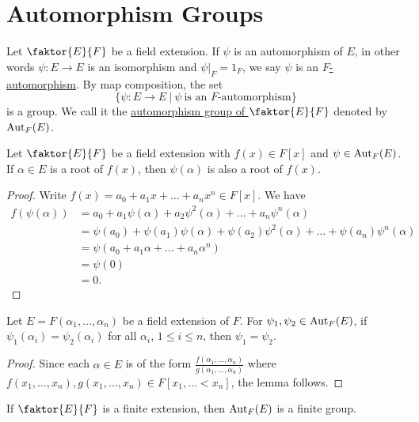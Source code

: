 \documentclass[11pt]{article}
\newcommand{\quotient}[2]{\faktor{#1}{#2}}
\begin{document}
\section{Automorphism Groups}
\begin{definition}
Let $\quotient{E}{F}$ be a field extension. If $\psi$ is an automorphism of $E$,
in other words $\psi: E \to E$ is an isomorphism and $\psi|_F = 1_F$, we say
$\psi$ is an \underline{$F$-automorphism}. By map composition, the set
\begin{equation*}
\{\psi:E\to E\>|\>\psi\>\text{is an }F\text{-automorphism}\}
\end{equation*}
is a group. We call it the \underline{automorphism group of $\quotient{E}{F}$}
denoted by $\operatorname{Aut}_F(E)$.
\end{definition}
\begin{lemma}
Let $\quotient{E}{F}$ be a field extension with $f(x) \in F[x]$ and $\psi \in
\operatorname{Aut}_F(E)$. If $\alpha \in E$ is a root of $f(x)$, then $\psi(\alpha)$ is also a
root of $f(x)$.
\label{lemma40}
\end{lemma}
\begin{proof}
Write $f(x) = a_0 + a_1x + \dots + a_nx^n \in F[x]$. We have
\begin{align*}
f(\psi(\alpha)) &= a_0 + a_1\psi(\alpha) + a_2\psi^2(\alpha) + \dots +
a_n\psi^n(\alpha)\\
&= \psi(a_0) + \psi(a_1)\psi(\alpha) + \psi(a_2)\psi^2(\alpha) + \dots +
\psi(a_n)\psi^n(\alpha)\\ 
&= \psi(a_0 + a_1\alpha + \dots + a_n\alpha^n)\\ 
&= \psi(0)\\ &= 0.
\end{align*}
\end{proof}
\begin{lemma}
Let $E = F(\alpha_1, \dots, \alpha_n)$ be a field extension of $F$. For
$\psi_1,\psi_2 \in \operatorname{Aut}_F(E)$, if $\psi_1(\alpha_i) = \psi_2(\alpha_i)$ for all
$\alpha_i$, $1 \leq i \leq n$, then $\psi_1 = \psi_2$.
\label{lemma41}
\end{lemma}
\begin{proof}
Since each $\alpha \in E$ is of the form $\displaystyle \frac{f(\alpha_1, \dots,
\alpha_n)}{g(\alpha_1, \dots, \alpha_n)}$ where $f(x_1, \dots, x_n), g(x_1,
\dots, x_n) \in F[x_1, \dots< x_n]$, the lemma follows.
\end{proof}
\begin{corollary}
If $\quotient{E}{F}$ is a finite extension, then $\operatorname{Aut}_F(E)$ is a finite group.
\label{corollary42}
\end{corollary}
\end{document}
